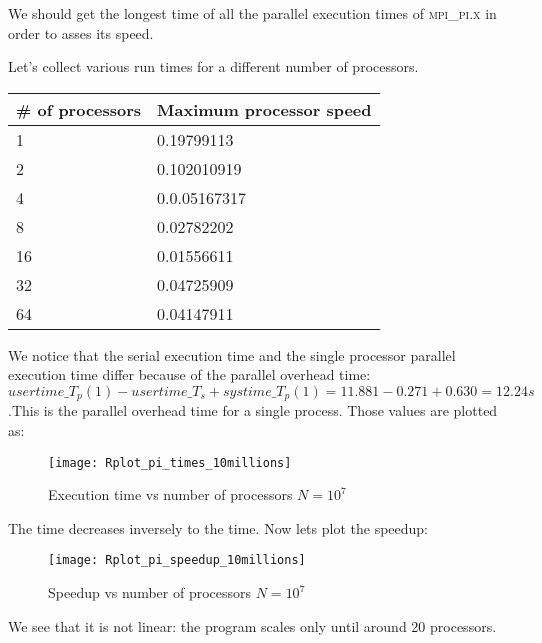 \documentclass[11pt]{scrartcl} %
\begin{document}
We should get the longest time of all the parallel execution times of \textsc{mpi\_pi.x} in order to asses its speed.

Let's collect various run times for a different number of processors. 
\begin{adjustwidth}{2cm}{}
	\begin{tabular}[h]{l|l }
		\hline
			\# of processors&Maximum processor speed\\
			\hline
			1&0.19799113\\
			2&0.102010919\\
			4&0.0.05167317\\
			8&0.02782202\\
			16&0.01556611\\
			32&0.04725909\\
			64&0.04147911\\
		\end{tabular}
	\end{adjustwidth}
We notice that the serial execution time and the single processor parallel execution time differ because of the parallel overhead time: $usertime\_T_p(1)-usertime\_T_s+systime\_T_p(1)= 11.881-0.271+ 0.630= 12.24 s$ .This is the parallel overhead time for a single process.
Those values are plotted as:
\begin{figure}[H] %
	\centering
	\texttt{[image: Rplot\_pi\_times\_10millions]} %
	\caption{Execution time vs number of processors $N = 10^7$ }
\end{figure}

The time decreases inversely to the time. Now lets plot the speedup: 
\begin{figure}[H] %
	\centering
	\texttt{[image: Rplot\_pi\_speedup\_10millions]} %
	\caption{Speedup vs number of processors $N=10^7$}
\end{figure}
We see that it is not linear: the program scales only until around 20 processors.
\end{document}

